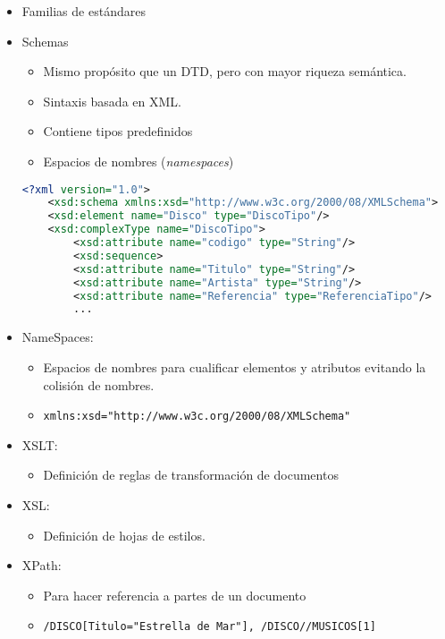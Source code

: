 \begin{itemize}[label=\color{red}\textbullet, leftmargin=*]
	\item \color{lightblue}Familias de estándares
\end{itemize}
\begin{itemize}[label=$-$]
	\item Schemas
	\begin{itemize}[label=\textbullet]
		\item Mismo propósito que un DTD, pero con mayor riqueza semántica.
		\item Sintaxis basada en XML.
		\item Contiene tipos predefinidos
		\item Espacios de nombres (\textit{namespaces})
	\end{itemize}
	\begin{lstlisting}[language=XML]
	<?xml version="1.0">
	<xsd:schema xmlns:xsd="http://www.w3c.org/2000/08/XMLSchema">
	<xsd:element name="Disco" type="DiscoTipo"/>
	<xsd:complexType name="DiscoTipo">
		<xsd:attribute name="codigo" type="String"/>
		<xsd:sequence>
		<xsd:attribute name="Titulo" type="String"/>
		<xsd:attribute name="Artista" type="String"/>
		<xsd:attribute name="Referencia" type="ReferenciaTipo"/>
		...
	\end{lstlisting}
	\item NameSpaces:
	\begin{itemize}[label=\textbullet]
		\item Espacios de nombres para cualificar elementos y atributos evitando la colisión de nombres.
		\item \texttt{xmlns:xsd="http://www.w3c.org/2000/08/XMLSchema"}
	\end{itemize}
	\item XSLT:
	\begin{itemize}[label=\textbullet]
		\item Definición de reglas de transformación de documentos
	\end{itemize}
	\item XSL:
	\begin{itemize}[label=\textbullet]
		\item Definición de hojas de estilos.
	\end{itemize}
	\item XPath:
	\begin{itemize}[label=\textbullet]
		\item Para hacer referencia a partes de un documento
		\item \texttt{/DISCO[Titulo="Estrella de Mar"], /DISCO//MUSICOS[1]}

\end{itemize}
\end{itemize}

